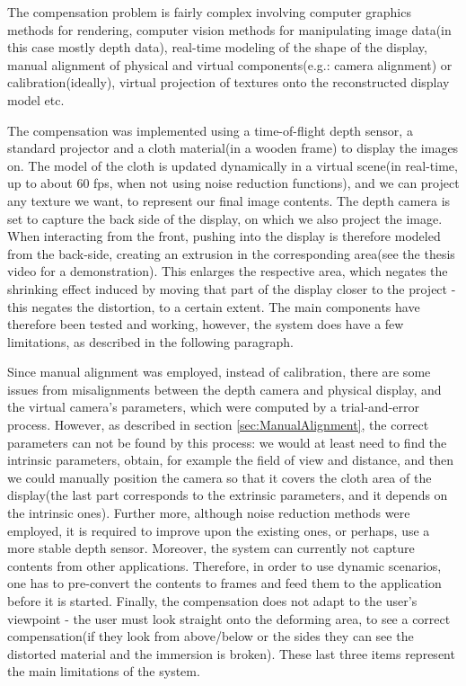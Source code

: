 \documentclass[]{article}
\begin{document}
The compensation problem is fairly complex involving computer graphics methods for rendering, computer vision methods for manipulating image data(in this case mostly depth data), real-time modeling of the shape of the display, manual alignment of physical and virtual components(e.g.: camera alignment) or calibration(ideally), virtual projection of textures onto the reconstructed display model etc. 

The compensation was implemented using a time-of-flight depth sensor, a standard projector and a cloth material(in a wooden frame) to display the images on. The model of the cloth is updated dynamically in a virtual scene(in real-time, up to about 60 fps, when not using noise reduction functions), and we can project any texture we want, to represent our final image contents. The depth camera is set to capture the back side of the display, on which we also project the image. When interacting from the front, pushing into the display is therefore modeled from the back-side, creating an extrusion in the corresponding area(see the thesis video for a demonstration). This enlarges the respective area, which negates the shrinking effect induced by moving that part of the display closer to the project - this negates the distortion, to a certain extent. The main components have therefore been tested and working, however, the system does have a few limitations, as described in the following paragraph.

Since manual alignment was employed, instead of calibration, there are some issues from misalignments between the depth camera and physical display, and the virtual camera's parameters, which were computed by a trial-and-error process. However, as described in section \ref{sec:ManualAlignment}, the correct parameters can not be found by this process: we would at least need to find the intrinsic parameters, obtain, for example the field of view and distance, and then we could manually position the camera so that it covers the cloth area of the display(the last part corresponds to the extrinsic parameters, and it depends on the intrinsic ones). Further more, although noise reduction methods were employed, it is required to improve upon the existing ones, or perhaps, use a more stable depth sensor. Moreover, the system can currently not capture contents from other applications. Therefore, in order to use dynamic scenarios, one has to pre-convert the contents to frames and feed them to the application before it is started. Finally, the compensation does not adapt to the user's viewpoint - the user must look straight onto the deforming area, to see a correct compensation(if they look from above/below or the sides they can see the distorted material and the immersion is broken). These last three items represent the main limitations of the system. 
\end{document}
